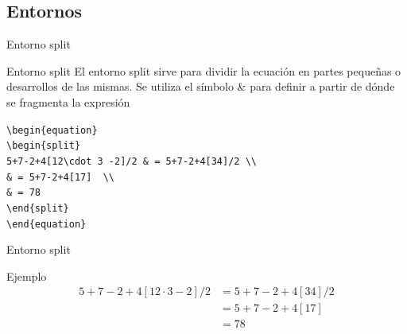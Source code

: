 \documentclass[aspectratio=169, 10pt]{beamer}
\begin{document}
\subsection{Entornos}
\begin{frame}[fragile]{Entorno split}
\begin{alertblock}{Entorno split}
El entorno split sirve para dividir la ecuación en partes pequeñas o desarrollos de las mismas. Se utiliza el símbolo \& para definir a partir de dónde se fragmenta la expresión

    \verb|\begin{equation}|\\
    \hspace{1cm} \verb|\begin{split}|\\
    \hspace{2cm}\verb|5+7-2+4[12\cdot 3 -2]/2 & = 5+7-2+4[34]/2 \\| \\
    \hspace{2cm} \verb|& = 5+7-2+4[17]  \\| \\
    \hspace{2cm} \verb|& = 78| \\
    \hspace{1cm} \verb|\end{split}| \\
    \verb|\end{equation}|
\end{alertblock}


\end{frame}
\begin{frame}[fragile]{Entorno split}
    \begin{exampleblock}{Ejemplo}
    \begin{equation}
            \begin{split}
                5+7-2+4[12\cdot 3 -2]/2 & = 5+7-2+4[34]/2 \\
                       & = 5+7-2+4[17]  \\
                       & = 78
            \end{split}
    \end{equation}
\end{exampleblock}
\end{frame}
\end{document}
